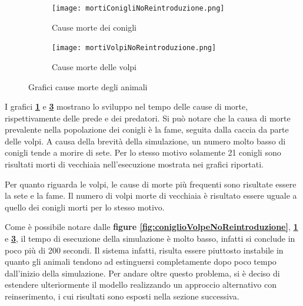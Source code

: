\documentclass[11pt]{article}
\begin{document}
\begin{figure}[h!]
	\begin{subfigure}{\textwidth}
            \centering
            \texttt{[image: mortiConigliNoReintroduzione.png]}
            \caption{Cause morte dei conigli}
            \label{fig:morteConigliNoReintroduzione}
	\end{subfigure}
		\begin{subfigure}{\textwidth}
		\centering
        \texttt{[image: mortiVolpiNoReintroduzione.png]}
        \caption{Cause morte delle volpi}
        \label{fig:morteVolpeNoReintroduzione}
	\end{subfigure}
\caption{Grafici cause morte degli animali}
\end{figure}

\newpage

I grafici \textbf{\ref{fig:morteConigliNoReintroduzione}} e \textbf{\ref{fig:morteVolpeNoReintroduzione}}  mostrano lo sviluppo nel tempo delle cause di morte, rispettivamente delle prede e dei predatori. Si può notare che la causa di morte prevalente nella popolazione dei conigli è la fame, seguita dalla caccia da parte delle volpi. A causa della brevità della simulazione, un numero molto basso di conigli tende a morire di sete. Per lo stesso motivo solamente 21 conigli sono risultati morti di vecchiaia nell'esecuzione mostrata nei grafici riportati. 

Per quanto riguarda le volpi, le cause di morte più frequenti sono risultate essere la sete e la fame. Il numero di volpi morte di vecchiaia è risultato essere uguale a quello dei conigli morti per lo stesso motivo. 



\noindent Come è possibile notare dalle \textbf{figure \ref{fig:coniglioVolpeNoReintroduzione}}, \textbf{\ref{fig:morteConigliNoReintroduzione}} e \textbf{\ref{fig:morteVolpeNoReintroduzione}}, il tempo di esecuzione della simulazione è molto basso, infatti si conclude in poco più di 200 secondi. Il sistema infatti, risulta essere piuttosto instabile in quanto gli animali tendono ad estinguersi completamente dopo poco tempo dall'inizio della simulazione. 
Per andare oltre questo problema, si è deciso di estendere ulteriormente il modello realizzando un approccio alternativo con reinserimento, i cui risultati sono esposti nella sezione successiva. 

\clearpage
\newpage
\end{document}
